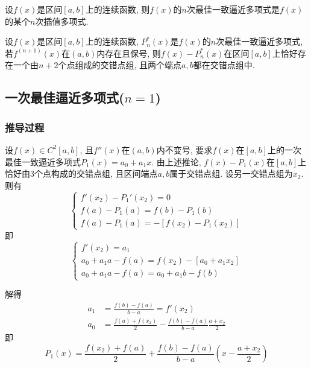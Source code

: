 \begin{corollary}
    设$f(x)$是区间$[a,b]$上的连续函数, 则$f(x)$的$n$次最佳一致逼近多项式是$f(x)$的某个$n$次插值多项式.
\end{corollary}

\begin{corollary}
    设$f(x)$是区间$[a,b]$上的连续函数, $P_n^*(x)$是$f(x)$的$n$次最佳一致逼近多项式, 若$f^{(n+1)}(x)$在$(a,b)$内存在且保号, 则$f(x)-P_n^*(x)$在区间$[a,b]$上恰好存在一个由$n+2$个点组成的交错点组, 且两个端点$a,b$都在交错点组中.
\end{corollary}

\subsection{一次最佳逼近多项式($n=1$)}

\subsubsection{推导过程}

设$f(x)\in C^2[a,b]$, 且$f''(x)$在$(a,b)$内不变号, 要求$f(x)$在$[a,b]$上的一次最佳一致逼近多项式$P_1(x)=a_0+a_1x$. 由上述推论, $f(x)-P_1(x)$在$[a,b]$上恰好由3个点构成的交错点组, 且区间端点$a,b$属于交错点组. 设另一交错点组为$x_2$. 则有
\begin{equation*}
    \begin{cases}
        f'(x_2)-P_1'(x_2)=0\\
        f(a)-P_1(a)=f(b)-P_1(b)\\
        f(a)-P_1(a)=-\left[f(x_2)-P_1(x_2)\right]
    \end{cases}
\end{equation*}
即
\begin{equation*}
    \begin{cases}
        f'(x_2)=a_1\\
        a_0+a_1a-f(a)=f(x_2)-[a_0+a_1x_2]\\
        a_0+a_1a-f(a)=a_0+a_1b-f(b)
    \end{cases}
\end{equation*}

解得
\begin{align*}
    a_1&=\frac{f(b)-f(a)}{b-a}=f'(x_2)\\
    a_0&=\frac{f(a)+f(x_2)}{2}-\frac{f(b)-f(a)}{b-a}\frac{a+x_2}{2}
\end{align*}
即
\begin{equation*}
    P_1(x)=\frac{f(x_2)+f(a)}{2}+\frac{f(b)-f(a)}{b-a}\left(x-\frac{a+x_2}{2}\right)
\end{equation*}

